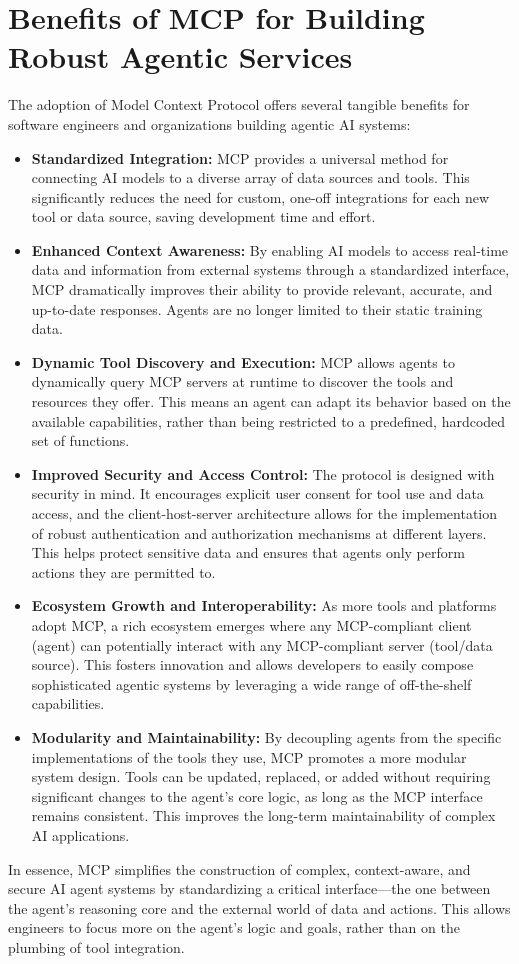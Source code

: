 \section{Benefits of MCP for Building Robust Agentic Services}

The adoption of Model Context Protocol offers several tangible benefits for software engineers and organizations building agentic AI systems:

\begin{itemize}
    \item \textbf{Standardized Integration:} MCP provides a universal method for connecting AI models to a diverse array of data sources and 
    tools. This significantly reduces the need for custom, one-off integrations for each new tool or data source, saving development time and effort.
    \item \textbf{Enhanced Context Awareness:} By enabling AI models to access real-time data and information from external systems 
    through a standardized interface, MCP dramatically improves their ability to provide relevant, accurate, and up-to-date responses. 
    Agents are no longer limited to their static training data.
    \item \textbf{Dynamic Tool Discovery and Execution:} MCP allows agents to dynamically query MCP servers at runtime to discover the 
    tools and resources they offer. This means an agent can adapt its behavior based on the available capabilities, rather than being 
    restricted to a predefined, hardcoded set of functions.
    \item \textbf{Improved Security and Access Control:} The protocol is designed with security in mind. It encourages explicit user 
    consent for tool use and data access, and the client-host-server architecture allows for the implementation of robust authentication 
    and authorization mechanisms at different layers. This helps protect sensitive data and ensures that agents only perform actions they 
    are permitted to.
    \item \textbf{Ecosystem Growth and Interoperability:} As more tools and platforms adopt MCP, a rich ecosystem emerges where any 
    MCP-compliant client (agent) can potentially interact with any MCP-compliant server (tool/data source). This fosters innovation and allows 
    developers to easily compose sophisticated agentic systems by leveraging a wide range of off-the-shelf capabilities.
    \item \textbf{Modularity and Maintainability:} By decoupling agents from the specific implementations of the tools they use, MCP promotes a 
    more modular system design. Tools can be updated, replaced, or added without requiring significant changes to the agent's core logic, 
    as long as the MCP interface remains consistent. This improves the long-term maintainability of complex AI applications.
\end{itemize}

In essence, MCP simplifies the construction of complex, context-aware, and secure AI agent systems by standardizing a 
critical interface---the one between the agent's reasoning core and the external world of data and actions. 
This allows engineers to focus more on the agent's logic and goals, rather than on the plumbing of tool integration. 